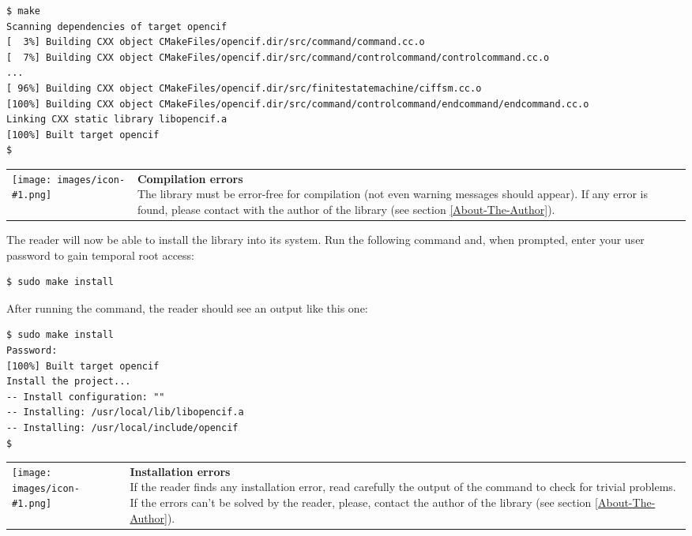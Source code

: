 \documentclass[11pt,twoside,openany,x11names,svgnames]{memoir}
\makeatletter
\newcommand{\IconNote}[3]
{
	\begin{table}[ht]
	\begin{tabular}{ lm{\dimexpr\textwidth-8\tabcolsep-\wd0}@{}}
		\toprule
		\texttt{[image: images/icon-\#1.png]}
		&
		\parbox[t]{155mm}{
		\textbf{#2} \\
		#3
		}
	\end{tabular}
\end{table}
}
\makeatother
\begin{document}
\begin{lstlisting}[frame=single,style=SystemCommandStyle]
$ make
Scanning dependencies of target opencif
[  3%] Building CXX object CMakeFiles/opencif.dir/src/command/command.cc.o
[  7%] Building CXX object CMakeFiles/opencif.dir/src/command/controlcommand/controlcommand.cc.o
...
[ 96%] Building CXX object CMakeFiles/opencif.dir/src/finitestatemachine/ciffsm.cc.o                                                                                                                                                         
[100%] Building CXX object CMakeFiles/opencif.dir/src/command/controlcommand/endcommand/endcommand.cc.o                                                                                                                                      
Linking CXX static library libopencif.a                                                                                                                                                                                                      
[100%] Built target opencif
$
\end{lstlisting}

\IconNote
	{warning}
	{Compilation errors}
	{The library must be error-free for compilation (not even warning messages should appear). If any error is found, please contact with the author of the library (see section \ref{About-The-Author}).}

The reader will now be able to install the library into its system. Run the following command and, when prompted, enter your user password to gain temporal root access:

\begin{lstlisting}[frame=single,style=SystemCommandStyle]
$ sudo make install
\end{lstlisting}

After running the command, the reader should see an output like this one:

\begin{lstlisting}[frame=single,style=SystemCommandStyle]
$ sudo make install
Password:
[100%] Built target opencif
Install the project...
-- Install configuration: ""
-- Installing: /usr/local/lib/libopencif.a
-- Installing: /usr/local/include/opencif
$
\end{lstlisting}

\IconNote
	{warning}
	{Installation errors}
	{If the reader finds any installation error, read carefully the output of the command to check for trivial problems. If the errors can't be solved by the reader, please, contact the author of the library (see section \ref{About-The-Author}).}
\end{document}
